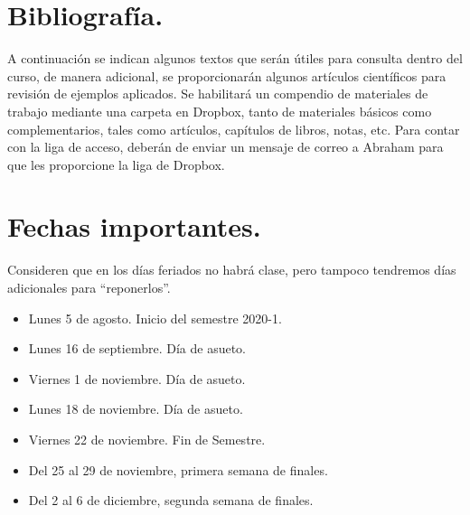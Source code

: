 \documentclass[12pt]{article}
\begin{document}
\section{Bibliografía.}
A continuación se indican algunos textos que serán útiles para consulta dentro del curso, de manera adicional, se proporcionarán algunos artículos científicos para revisión de ejemplos aplicados. Se habilitará un compendio de materiales de trabajo mediante una carpeta en Dropbox, tanto de materiales básicos como complementarios, tales como artículos, capítulos de libros, notas, etc. Para contar con la liga de acceso, deberán de enviar un mensaje de correo a Abraham para que les proporcione la liga de Dropbox.

\renewcommand{\refname}{Bibliografía básica.}
\nocite{*}



\section{Fechas importantes.}
Consideren que en los días feriados no habrá clase, pero tampoco tendremos días adicionales para \enquote{reponerlos}.
\begin{itemize}
\item Lunes 5 de agosto. Inicio del semestre 2020-1.
\item Lunes 16 de septiembre. Día de asueto.
\item Viernes 1 de noviembre. Día de asueto.
\item Lunes 18 de noviembre. Día de asueto.
\item Viernes 22 de noviembre. Fin de Semestre.
\item Del 25 al 29 de noviembre, primera semana de finales.
\item Del 2 al 6 de diciembre, segunda semana de finales.
\end{itemize}
\end{document}
